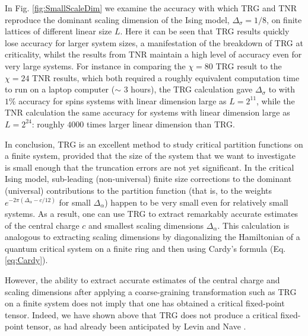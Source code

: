 \documentclass[aps,prl,twocolumn,showpacs,superscriptaddress,floatfix,10pt]{revtex4-1}
\begin{document}
In Fig. \ref{fig:SmallScaleDim} we examine the accuracy with which TRG and TNR reproduce the dominant scaling dimension of the Ising model, $\Delta_\sigma = 1/8$, on finite lattices of different linear size $L$. Here it can be seen that TRG results quickly lose accuracy for larger system sizes, a manifestation of the breakdown of TRG at criticality, whilst the results from TNR maintain a high level of accuracy even for very large systems. For instance in comparing the $\chi=80$ TRG result to the $\chi=24$ TNR results, which both required a roughly equivalent computation time to run on a laptop computer ($\sim$ 3 hours), the TRG calculation gave $\Delta_{\sigma}$ to with $1\%$ accuracy for spins systems with linear dimension large as $L=2^{11}$, while the TNR calculation the same accuracy for systems with linear dimension large as $L=2^{24}$: roughly $4000$ times larger linear dimension than TRG.

In conclusion, TRG is an excellent method to study critical partition functions on a finite system, provided that the size of the system that we want to investigate is small enough that the truncation errors are not yet significant. In the critical Ising model, sub-leading (non-universal) finite size corrections to the dominant (universal) contributions to the partition function (that is, to the weights $e^{-2\pi(\Delta_{\alpha} - c/12)}$ for small $\Delta_{\alpha}$) happen to be very small even for relatively small systems. As a result, one can use TRG to extract remarkably accurate estimates of the central charge $c$ and smallest scaling dimensions $\Delta_{\alpha}$. This calculation is analogous to extracting scaling dimensions by diagonalizing the Hamiltonian of a quantum critical system on a finite ring and then using Cardy's formula (Eq. \ref{eq:Cardy}). 

However, the ability to extract accurate estimates of the central charge and scaling dimensions after applying a coarse-graining transformation such as TRG on a finite system does not imply that one has obtained a critical fixed-point tensor. Indeed, we have shown above that TRG does not produce a critical fixed-point tensor, as had already been anticipated by Levin and Nave \cite{TRG}. 
\end{document}
